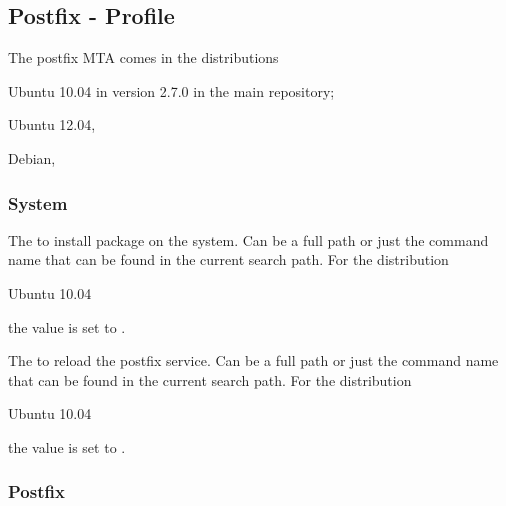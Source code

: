 \label{sec:postfix_profile}
\subsection{Postfix - Profile}

The postfix MTA comes in the distributions 
\begin{compactitem}
\item[\TheDistribution{ubuntu}] Ubuntu 10.04 in version 2.7.0 in the main repository;
\item[\TheDistribution{ubuntu}] Ubuntu 12.04,
\item[\TheDistribution{debian}] Debian,
\end{compactitem}

\subsubsection*{System}


The  to install package on the system. Can be a full path or
just the command name that can be found in the current search path. 
For the distribution
\begin{inparaitem}
\item[\TheDistribution{ubuntu}] Ubuntu 10.04
\end{inparaitem}
the value is set to .


The  to reload the postfix service. Can be a full path or
just the command name that can be found in the current search path.
For the distribution
\begin{inparaitem}
\item[\TheDistribution{ubuntu}] Ubuntu 10.04
\end{inparaitem}
the value is set to .

\subsubsection*{Postfix}


